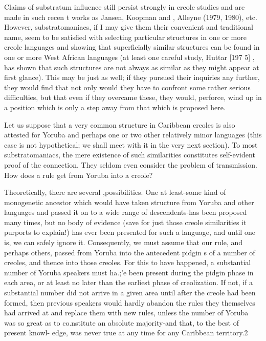 Claims of substratum influence still persist strongly in creole studies and are made in such recen t works as Jansen, Koopman and \citet{Muysken1978}, Alleyne (1979, 1980), etc. However, substrato\-maniacs, if I may give them their convenient and traditional name, seem to be satisfied with selecting particular structures in one or more creole languages and showing that superficially similar structures can be found in one or more West African languages (at least one careful study, Huttar [197 5] , has shown that such structures are not always as similar as they might appear at first glance). This may be just as well; if they pursued their inquiries any further, they would find that not only would they have to confront some rather serious diffi\-culties, but that even if they overcame these, they would, perforce, wind up in a position which is only a step away from that which is proposed here.

Let us suppose that a very common structure in Caribbean creoles is also attested for Yoruba and perhaps one or two other rela\-tively minor languages (this case is not hypothetical; we shall meet with it in the very next section). To most substratomaniacs, the mere existence of such similarities constitutes self-evident proof of the connection. They seldom even consider the problem of transmission. How does a rule get from Yoruba into a creole?

Theoretically, there are several ,possibilities. One at least-some kind of monogenetic ancestor which would have taken structure from Yoruba and other languages and passed it on to a wide range of descen\-dents-has been proposed many times, but no body of evidence (save for just those creole similarities it purports to explain!) has ever been presented for such a language, and until one is, we can safely ignore it. Consequently, we must assume that our rule, and perhaps others, passed from Yoruba into the antecedent pidgin s of a number of creoles, and thence into those creoles. For this to have happened, a substantial number of Yoruba speakers must ha.;'e been present during the pidgin
phase in each area, or at least no later than the earliest phase of creoli\-zation. If not, if a substantial number did not arrive in a given area until after the creole had been formed, then previous speakers would hardly abandon the rules they themselves had arrived at and replace them with new rules, unless the number of Yoruba was so great as to co.nstitute an absolute majority-and that, to the best of present knowl- edge, was never true at any time for any Caribbean territory.2

